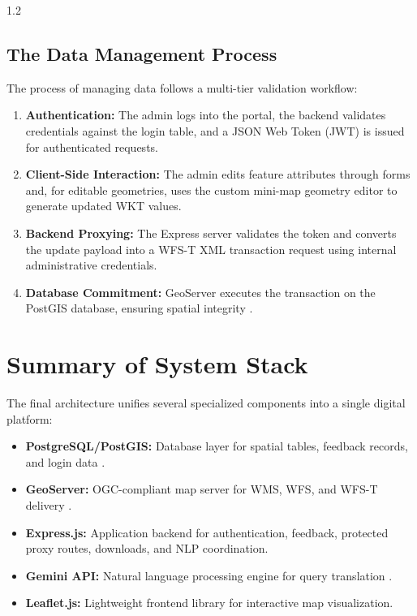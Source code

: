 \begin{spacing}{1.2}
\subsection{The Data Management Process}

The process of managing data follows a multi-tier validation workflow:
\begin{enumerate}
    \item \textbf{Authentication:} The admin logs into the portal, the backend validates credentials against the login table, and a JSON Web Token (JWT) is issued for authenticated requests.
    \item \textbf{Client-Side Interaction:} The admin edits feature attributes through forms and, for editable geometries, uses the custom mini-map geometry editor to generate updated WKT values.
    \item \textbf{Backend Proxying:} The Express server validates the token and converts the update payload into a WFS-T XML transaction request using internal administrative credentials.
    \item \textbf{Database Commitment:} GeoServer executes the transaction on the PostGIS database, ensuring spatial integrity \cite{postgis_in_action}.
\end{enumerate}

\section{Summary of System Stack}

The final architecture unifies several specialized components into a single digital platform:
\begin{itemize}
    \item \textbf{PostgreSQL/PostGIS:} Database layer for spatial tables, feedback records, and login data \cite{postgis_in_action}.
    \item \textbf{GeoServer:} OGC-compliant map server for WMS, WFS, and WFS-T delivery \cite{fu2020webgis}.
    \item \textbf{Express.js:} Application backend for authentication, feedback, protected proxy routes, downloads, and NLP coordination.
    \item \textbf{Gemini API:} Natural language processing engine for query translation \cite{liu2025nalspatial}.
    \item \textbf{Leaflet.js:} Lightweight frontend library for interactive map visualization.
\end{itemize}

\end{spacing}
